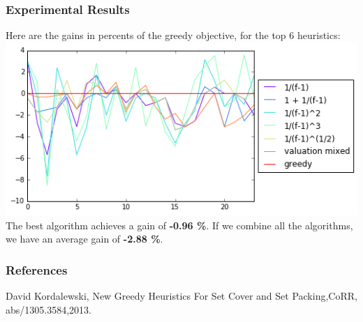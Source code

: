 \documentclass[xcolor=dvipsnames]{beamer}
\begin{document}
\begin{frame}
\frametitle{Experimental Results}
Here are the gains in percents of the greedy objective, for the top 6 heuristics:
\includegraphics[width=\textwidth]{../results/heuristics_best6} \\
The best algorithm achieves a gain of \textbf{-0.96 \%}. If we combine all the algorithms, we have an average gain of \textbf{-2.88 \%}.
\end{frame}

\begin{frame}
\frametitle{References}
\begin{thebibliography}{1}
 David Kordalewski, New Greedy Heuristics For Set Cover and Set Packing,CoRR, abs/1305.3584,2013.
\end{thebibliography}
\end{frame}
\end{document}

